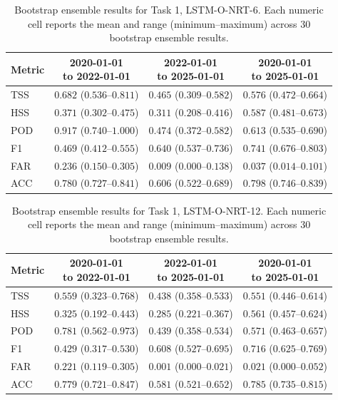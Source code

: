 \begin{table}[htbp]
\centering
\small
\caption{Bootstrap ensemble results for Task 1, LSTM-O-NRT-6. Each numeric cell reports the mean and range (minimum--maximum) across 30 bootstrap ensemble results.}
\label{tab:app-task1-lstm-o-nrt-6}
\begin{tabular}{lccc}
\toprule
Metric & \shortstack{2020-01-01\\to 2022-01-01} & \shortstack{2022-01-01\\to 2025-01-01} & \shortstack{2020-01-01\\to 2025-01-01} \\
\midrule
TSS & $0.682$ ($0.536$--$0.811$) & $0.465$ ($0.309$--$0.582$) & $0.576$ ($0.472$--$0.664$) \\
HSS & $0.371$ ($0.302$--$0.475$) & $0.311$ ($0.208$--$0.416$) & $0.587$ ($0.481$--$0.673$) \\
POD & $0.917$ ($0.740$--$1.000$) & $0.474$ ($0.372$--$0.582$) & $0.613$ ($0.535$--$0.690$) \\
F1 & $0.469$ ($0.412$--$0.555$) & $0.640$ ($0.537$--$0.736$) & $0.741$ ($0.676$--$0.803$) \\
FAR & $0.236$ ($0.150$--$0.305$) & $0.009$ ($0.000$--$0.138$) & $0.037$ ($0.014$--$0.101$) \\
ACC & $0.780$ ($0.727$--$0.841$) & $0.606$ ($0.522$--$0.689$) & $0.798$ ($0.746$--$0.839$) \\
\bottomrule
\end{tabular}
\end{table}
\clearpage

\begin{table}[htbp]
\centering
\small
\caption{Bootstrap ensemble results for Task 1, LSTM-O-NRT-12. Each numeric cell reports the mean and range (minimum--maximum) across 30 bootstrap ensemble results.}
\label{tab:app-task1-lstm-o-nrt-12}
\begin{tabular}{lccc}
\toprule
Metric & \shortstack{2020-01-01\\to 2022-01-01} & \shortstack{2022-01-01\\to 2025-01-01} & \shortstack{2020-01-01\\to 2025-01-01} \\
\midrule
TSS & $0.559$ ($0.323$--$0.768$) & $0.438$ ($0.358$--$0.533$) & $0.551$ ($0.446$--$0.614$) \\
HSS & $0.325$ ($0.192$--$0.443$) & $0.285$ ($0.221$--$0.367$) & $0.561$ ($0.457$--$0.624$) \\
POD & $0.781$ ($0.562$--$0.973$) & $0.439$ ($0.358$--$0.534$) & $0.571$ ($0.463$--$0.657$) \\
F1 & $0.429$ ($0.317$--$0.530$) & $0.608$ ($0.527$--$0.695$) & $0.716$ ($0.625$--$0.769$) \\
FAR & $0.221$ ($0.119$--$0.305$) & $0.001$ ($0.000$--$0.021$) & $0.021$ ($0.000$--$0.052$) \\
ACC & $0.779$ ($0.721$--$0.847$) & $0.581$ ($0.521$--$0.652$) & $0.785$ ($0.735$--$0.815$) \\
\bottomrule
\end{tabular}
\end{table}
\clearpage

